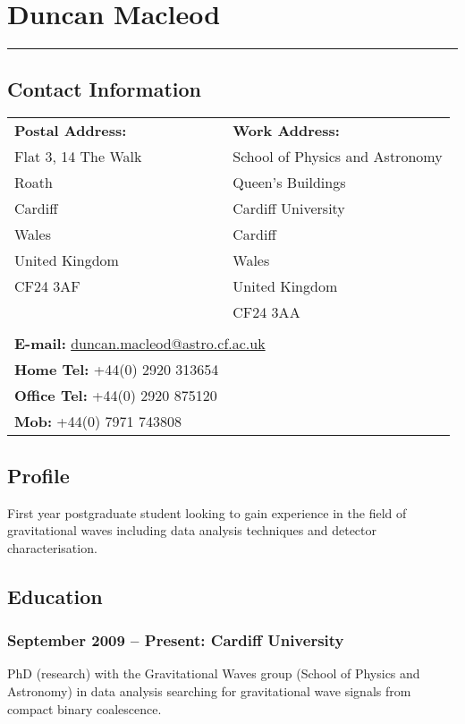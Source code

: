 \documentclass{article}
\begin{document}
\section*{Duncan Macleod}

\hrule \vspace{5mm}

\subsection*{Contact Information}
\begin{center}
\begin{tabular}{ll}
\textbf{Postal Address:} & \textbf{Work Address:} \\
Flat 3, 14 The Walk & School of Physics and Astronomy\\
Roath & Queen's Buildings\\
Cardiff & Cardiff University\\
Wales & Cardiff \\
United Kingdom & Wales\\
CF24 3AF & United Kingdom\\
& CF24 3AA \\
\\
\multicolumn{2}{l}{\textbf{E-mail:}
\href{mailto:duncan.macleod@astro.cf.ac.uk}{duncan.macleod@astro.cf.ac.uk}}\\
\textbf{Home Tel:} +44(0) 2920 313654\\
\textbf{Office Tel:} +44(0) 2920 875120\\
\textbf{Mob:} +44(0) 7971 743808\\
\end{tabular}
\end{center}

\subsection*{Profile} 
First year postgraduate student looking to gain experience in the field of gravitational waves including data analysis techniques and detector characterisation.

\subsection*{Education}
\subsubsection*{September 2009 -- Present: Cardiff University}
PhD (research) with the Gravitational Waves group (School of Physics and Astronomy) in data analysis searching for gravitational wave signals from compact binary coalescence.
\end{document}
